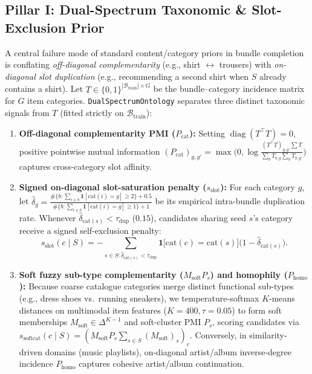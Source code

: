 \subsection{Pillar I: Dual-Spectrum Taxonomic \& Slot-Exclusion Prior}
\label{sec:ontology-method}
A central failure mode of standard content/category priors in bundle completion is conflating \emph{off-diagonal
complementarity} (e.g., shirt $\leftrightarrow$ trousers) with \emph{on-diagonal slot duplication} (e.g., recommending
a second shirt when $S$ already contains a shirt). Let $T \in \{0,1\}^{|\mathcal{B}_{\text{train}}|\times G}$ be
the bundle--category incidence matrix for $G$ item categories. \texttt{DualSpectrumOntology} separates three
distinct taxonomic signals from $T$ (fitted strictly on $\mathcal{B}_{\text{train}}$):
\begin{enumerate}\itemsep1pt
  \item \textbf{Off-diagonal complementarity PMI ($P_{\text{cat}}$):} Setting $\operatorname{diag}(T^{\!\top}T)=0$,
  positive pointwise mutual information $(P_{\text{cat}})_{g,g'} = \max\!\big(0, \log\frac{(T^{\!\top}T)_{g,g'}
  \sum T}{\sum_b T_{b,g}\sum_b T_{b,g'}}\big)$ captures cross-category slot affinity.
  \item \textbf{Signed on-diagonal slot-saturation penalty ($s_{\text{slot}}$):} For each category $g$, let
  $\hat{\delta}_g = \frac{\#\{b : \sum_{i\in b}\mathbf{1}[\text{cat}(i)=g] \ge 2\} + 0.5}{\#\{b : \sum_{i\in b}\mathbf{1}[\text{cat}(i)=g] \ge 1\} + 1}$
  be its empirical intra-bundle duplication rate. Whenever $\hat{\delta}_{\text{cat}(s)} < \tau_{\text{dup}}$
  ($0.15$), candidates sharing seed $s$'s category receive a signed self-exclusion penalty:
  \begin{equation}
    s_{\text{slot}}(c\mid S) = -\sum_{s\in S : \hat{\delta}_{\text{cat}(s)} < \tau_{\text{dup}}}
    \mathbf{1}\big[\text{cat}(c) = \text{cat}(s)\big]\big(1 - \hat{\delta}_{\text{cat}(s)}\big).
    \label{eq:slot}
  \end{equation}
  \item \textbf{Soft fuzzy sub-type complementarity ($M_{\text{soft}}P_s$) and homophily ($P_{\text{homo}}$):}
  Because coarse catalogue categories merge distinct functional sub-types (e.g., dress shoes vs.\ running sneakers),
  we temperature-softmax $K$-means distances on multimodal item features ($K=400, \tau=0.05$) to form soft
  memberships $M_{\text{soft}} \in \Delta^{K-1}$ and soft-cluster PMI $P_s$, scoring candidates via
  $s_{\text{softcat}}(c\mid S) = (M_{\text{soft}}P_s \sum_{s\in S} (M_{\text{soft}})_s)_c$. Conversely, in
  similarity-driven domains (music playlists), on-diagonal artist/album inverse-degree incidence $P_{\text{homo}}$
  captures cohesive artist/album continuation.
\end{enumerate}

